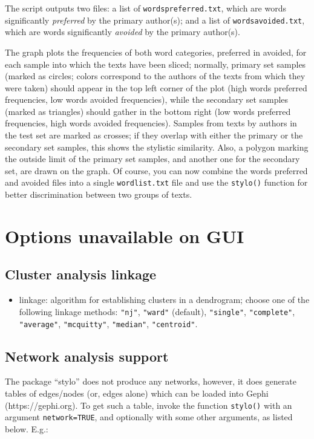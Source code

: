 \documentclass[11pt,a4paper]{article}
\def\underscore{\raisebox{-.8ex}{-}}
\def\margin#1{\marginpar{\textcolor{blue}{\footnotesize\tt #1}}}
\def\code#1{{\tt #1}}
\begin{document}
The script outputs two files: a list of \code{words\underscore{}preferred.txt},
which are words significantly \textit{preferred} by the primary author(s);
and a list of \code{words\underscore{}avoided.txt}, which are
words significantly \textit{avoided} by the primary author(s).

The graph plots the frequencies of both word categories, preferred
in avoided, for each sample into which the texts have been sliced;
normally, primary set samples (marked as circles; colors correspond
to the authors of the texts from which they were taken) should appear
in the top left corner of the plot (high words preferred frequencies,
low words avoided frequencies), while the secondary set samples (marked
as triangles) should gather in the bottom right (low words preferred
frequencies, high words avoided frequencies). Samples from texts by
authors in the test set are marked as crosses; if they overlap with
either the primary or the secondary set samples, this shows the stylistic
similarity. Also, a polygon marking the outside limit of the primary
set samples, and another one for the secondary set, are drawn on the
graph. Of course, you can now combine the words preferred and avoided 
files into a single \code{wordlist.txt} file and use the \code{stylo()} 
function for better discrimination between two groups of texts.

\section{Options unavailable on GUI}

\subsection{Cluster analysis linkage}

\begin{itemize}
\item linkage:\margin{linkage=} algorithm for establishing clusters in a dendrogram;  choose one of the following linkage methods: \code{"nj"}, \code{"ward"} (default), \code{"single"}, \code{"complete"}, \code{"average"},  \code{"mcquitty"}, \code{"median"}, \code{"centroid"}.
\end{itemize}

\subsection{Network analysis support}

The package ``stylo'' does not produce any networks, however, it does generate
tables of edges/nodes (or, edges alone) which can be loaded into Gephi 
(https://gephi.org). To get such a table, invoke the function \code{stylo()}
with an argument \code{network=TRUE}, and optionally with some other arguments,
as listed below. E.g.:
\end{document}
